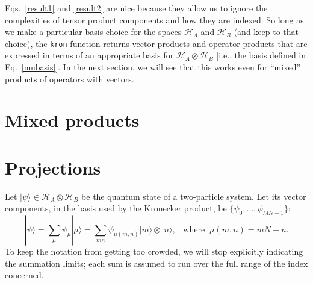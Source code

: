 \documentclass[pra,12pt]{revtex4}
\begin{document}
Eqs.~\eqref{result1} and \eqref{result2} are nice because they allow
us to ignore the complexities of tensor product components and how
they are indexed.  So long as we make a particular basis choice for
the spaces $\mathscr{H}_A$ and $\mathscr{H}_B$ (and keep to that
choice), the \texttt{kron} function returns vector products and
operator products that are expressed in terms of an appropriate basis
for $\mathscr{H}_A\otimes\mathscr{H}_B$ [i.e., the basis defined in
  Eq.~\eqref{mubasis}].  In the next section, we will see that this
works even for ``mixed'' products of operators with vectors.

\section{Mixed products}


\section{Projections}

Let $|\psi\rangle \in \mathscr{H}_A\otimes \mathscr{H}_B$ be the quantum state
of a two-particle system.  Let its vector components, in the basis
used by the Kronecker product, be $\{\psi_0, \dots, \psi_{MN-1}\}$:
$$|\psi\rangle = \sum_{\mu} \psi_\mu |\mu\rangle = \sum_{mn} \psi_{\mu(m,n)} |m\rangle\otimes|n\rangle, \;\;\;\mathrm{where}\;\;\mu(m,n) = mN+n.$$
To keep the notation from getting too crowded, we will stop explicitly
indicating the summation limits; each sum is assumed to run over the
full range of the index concerned.
\end{document}
